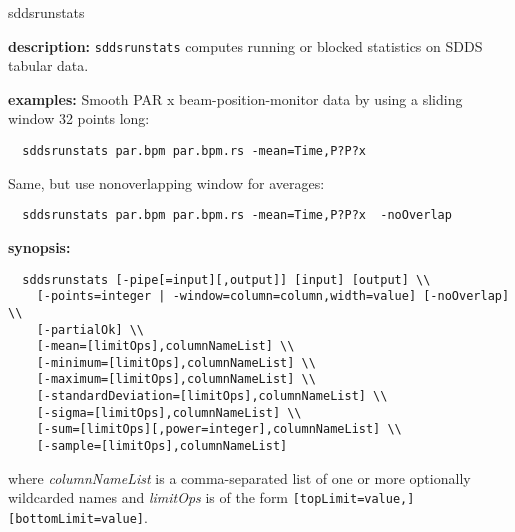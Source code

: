 \begin{sddsprog}{sddsrunstats}
  \item \textbf{description:} \verb|sddsrunstats| computes running or blocked statistics on SDDS tabular data.

  \item \textbf{examples:}
  Smooth PAR x beam-position-monitor data by using a sliding window 32 points long:
  \begin{verbatim}
  sddsrunstats par.bpm par.bpm.rs -mean=Time,P?P?x
  \end{verbatim}
  Same, but use nonoverlapping window for averages:
  \begin{verbatim}
  sddsrunstats par.bpm par.bpm.rs -mean=Time,P?P?x  -noOverlap
  \end{verbatim}

  \item \textbf{synopsis:}
  \begin{verbatim}
  sddsrunstats [-pipe[=input][,output]] [input] [output] \\
    [-points=integer | -window=column=column,width=value] [-noOverlap] \\
    [-partialOk] \\
    [-mean=[limitOps],columnNameList] \\
    [-minimum=[limitOps],columnNameList] \\
    [-maximum=[limitOps],columnNameList] \\
    [-standardDeviation=[limitOps],columnNameList] \\
    [-sigma=[limitOps],columnNameList] \\
    [-sum=[limitOps][,power=integer],columnNameList] \\
    [-sample=[limitOps],columnNameList]
  \end{verbatim}
  where \emph{columnNameList} is a comma-separated list of one or more optionally wildcarded names and \emph{limitOps} is of the form \verb|[topLimit=value,][bottomLimit=value]|.


\end{sddsprog}

